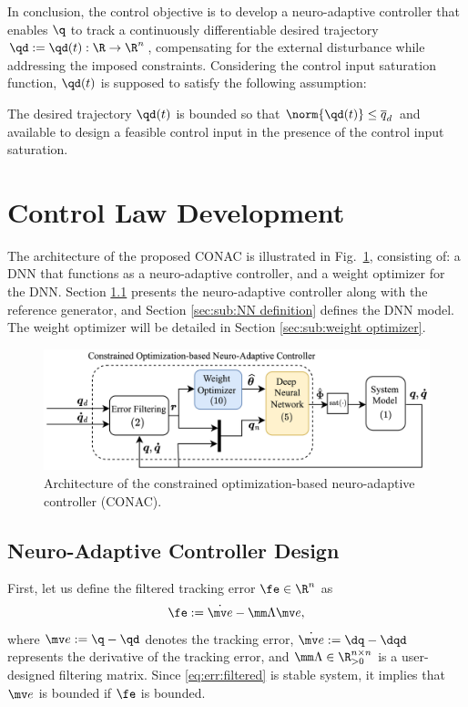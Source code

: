 \documentclass[lettersize,journal]{IEEEtran}
\begin{document}
In conclusion, the control objective is to develop a neuro-adaptive controller that enables $\q$ to track a continuously differentiable desired trajectory $\qd:=\qd(t): \R \to \R^n$, compensating for the external disturbance while addressing the imposed constraints.
Considering the control input saturation function, $\qd(t)$ is supposed to satisfy the following assumption:
\begin{assum}
    The desired trajectory $\qd(t)$ is bounded so that $\norm{\qd(t)}\le \overline{q}_d$ and available to design a feasible control input in the presence of the control input saturation.
    \label{assum:feasible}
\end{assum}

\section{Control Law Development}\label{sec:ctrl design}

The architecture of the proposed CONAC is illustrated in Fig.~\ref{fig:ctrl:diagram}, consisting of: a DNN that functions as a neuro-adaptive controller, and a weight optimizer for the DNN. 
Section \ref{sec:sub:NAC} presents the neuro-adaptive controller along with the reference generator, and Section \ref{sec:sub:NN definition} defines the DNN model. The weight optimizer will be detailed in Section \ref{sec:sub:weight optimizer}.

\begin{figure}[!t]
    \centering
    \includegraphics[width=.55\linewidth]{src/figures/Controller.drawio.pdf}
    \caption{Architecture of the constrained optimization-based neuro-adaptive controller (CONAC).}
    \label{fig:ctrl:diagram}
\end{figure}

\subsection{Neuro-Adaptive Controller Design}\label{sec:sub:NAC}

First, let us define the filtered tracking error $\fe\in\R^n$ as 
\begin{equation}
    \fe := \dot{\mv e}-\mm\Lambda \mv e
    ,
    \label{eq:err:filtered}
\end{equation}
where $\mv e := \q - \qd$ denotes the tracking error, $\dot{\mv e} := \dq - \dqd$ represents the derivative of the tracking error, and $\mm\Lambda\in\R^{n\times n}_{>0}$ is a user-designed filtering matrix.
Since \eqref{eq:err:filtered} is stable system, it implies that $\mv e$ is bounded if $\fe$ is bounded.
\end{document}
